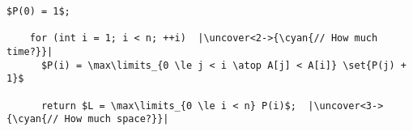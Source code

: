 \begin{frame}[fragile]{}
  \begin{lstlisting}[style = Cstyle]
    $P(0) = 1$;

    for (int i = 1; i < n; ++i)  |\uncover<2->{\cyan{// How much time?}}|
      $P(i) = \max\limits_{0 \le j < i \atop A[j] < A[i]} \set{P(j) + 1}$

      return $L = \max\limits_{0 \le i < n} P(i)$;  |\uncover<3->{\cyan{// How much space?}}|
  \end{lstlisting}



\end{frame}
